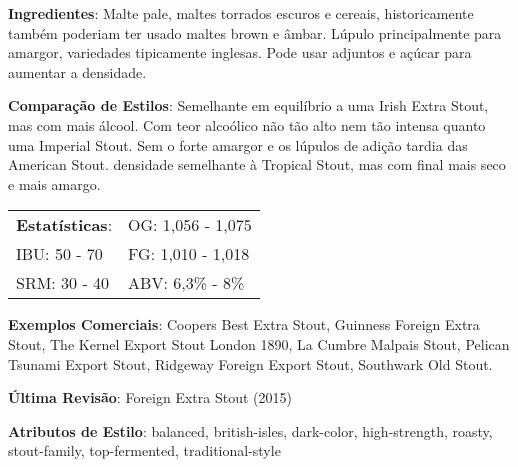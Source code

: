 \textbf{Ingredientes}: Malte pale, maltes torrados escuros e cereais, historicamente também poderiam ter usado maltes brown e âmbar. Lúpulo principalmente para amargor, variedades tipicamente inglesas. Pode usar adjuntos e açúcar para aumentar a densidade.

\textbf{Comparação de Estilos}: Semelhante em equilíbrio a uma Irish Extra Stout, mas com mais álcool. Com teor alcoólico não tão alto nem tão intensa quanto uma Imperial Stout. Sem o forte amargor e os lúpulos de adição tardia das American Stout. densidade semelhante à Tropical Stout, mas com final mais seco e mais amargo.

\begin{tabular}{@{}p{35mm}p{35mm}@{}}
  \textbf{Estatísticas}: & OG: 1,056 - 1,075 \\
  IBU: 50 - 70  & FG: 1,010 - 1,018  \\
  SRM: 30 - 40   & ABV: 6,3\% - 8\%
\end{tabular}

\textbf{Exemplos Comerciais}: Coopers Best Extra Stout, Guinness Foreign Extra Stout, The Kernel Export Stout London 1890, La Cumbre Malpais Stout, Pelican Tsunami Export Stout, Ridgeway Foreign Export Stout, Southwark Old Stout.

\textbf{Última Revisão}: Foreign Extra Stout (2015)

\textbf{Atributos de Estilo}: balanced, british-isles, dark-color, high-strength, roasty, stout-family, top-fermented, traditional-style
